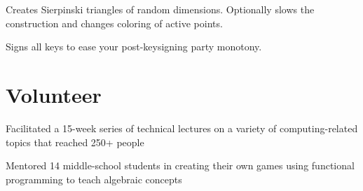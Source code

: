 \documentclass[letterpaper]{deedy-resume} %
\begin{document}
\begin{minipage}[t]{0.66\textwidth}

Creates Sierpinski triangles of random dimensions. Optionally slows the construction and changes coloring of active points. \\
\sectionspace %

Signs all keys to ease your post-keysigning party monotony. \\
\sectionspace %


\section{Volunteer}


\begin{tightitemize}
\item Facilitated a 15-week series of technical lectures on a variety of computing-related topics that reached 250+ people
\end{tightitemize}

\sectionspace %



\begin{tightitemize}
\item Mentored 14 middle-school students in creating their own games using functional programming to teach algebraic concepts
\end{tightitemize}

\sectionspace %


\end{minipage} %
\end{document}
